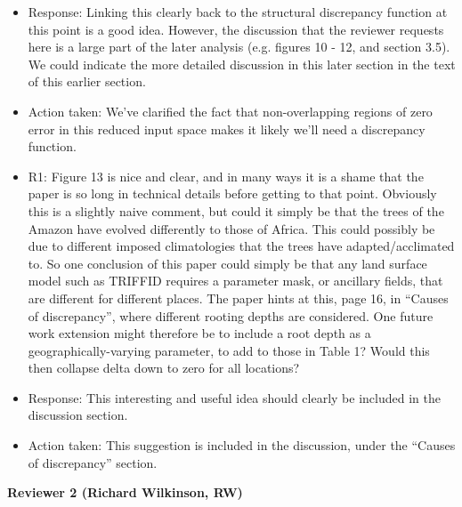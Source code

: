\documentclass[esd, manuscript]{copernicus}
\begin{document}
\begin{itemize}
\item{Response: Linking this clearly back to the structural discrepancy function at this point is a good idea. However, the discussion that the reviewer requests here is a large part of the later analysis (e.g. figures 10 - 12, and section 3.5). We could indicate the more detailed discussion in this later section in the text of this earlier section.}

\item{Action taken: We've clarified the fact that non-overlapping regions of zero error in this reduced input space makes it likely we'll need a discrepancy function.}

\item{R1: Figure 13 is nice and clear, and in many ways it is a shame that the paper is so long in technical details before getting to that point. Obviously this is a slightly naive comment, but could it simply be that the trees of the Amazon have evolved differently to those of Africa. This could possibly be due to different imposed climatologies that the trees have adapted/acclimated to. So one conclusion of this paper could simply be that any land surface model such as TRIFFID requires a parameter mask, or ancillary fields, that are different for different places. The paper hints at this, page 16, in ``Causes of discrepancy'', where different rooting depths are considered. One future work extension might therefore be to include a root depth as a geographically-varying parameter, to add to those in Table 1? Would this then collapse delta down to zero for all locations?}

\item{Response: This interesting and useful idea should clearly be included in the discussion section.}

\item{Action taken: This suggestion is included in the discussion, under the ``Causes of discrepancy'' section.}
\end{itemize}

\textbf{Reviewer 2 (Richard Wilkinson, RW)}
\end{document}
